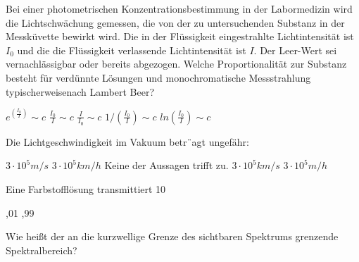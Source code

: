 \documentclass[11pt]{exam}
\begin{document}
\setlength{\voffset}{-0.5in}
\setlength{\headsep}{5pt}

\hspace{2mm}
 \hspace{5mm}
\vspace{4mm}

\begin{questions}

\question Bei einer photometrischen Konzentrationsbestimmung in der Labormedizin wird die Lichtschwächung gemessen, die von der zu untersuchenden Substanz in der Messküvette bewirkt wird. Die in der Flüssigkeit eingestrahlte Lichtintensität ist \( I_0 \) und die die Flüssigkeit verlassende Lichtintensität ist \(I\). Der Leer-Wert sei vernachlässigbar oder bereits abgezogen. Welche Proportionalität zur Substanz besteht für verdünnte Lösungen und monochromatische Messstrahlung typischerweisenach Lambert Beer?

\begin{choices}
	\choice \( e^{( \frac{I_0}{I})} \sim c \)
	\choice \( \frac{I_0}{I} \sim c \)
	\choice \( \frac{I}{I_0} \sim c \)
	\choice \( 1/( \frac{I_0}{I}) \sim c \)
	\choice \( ln ( \frac{I_0}{I}) \sim c \)
\end{choices}

\vspace{3mm}\question Die Lichtgeschwindigkeit im Vakuum betr¨agt ungefähr:

\begin{choices}
	\choice \( 3 \cdot10^5 m/s \)
	\choice \( 3 \cdot10^5 km/h \)
	\choice Keine der Aussagen trifft zu.
	\choice \( 3 \cdot10^5 km/s \)
	\choice \( 3 \cdot10^5 m/h \)
\end{choices}

\vspace{3mm}\question Eine Farbstofflösung transmittiert 10 %

\begin{choices}
	,01
	,99
\end{choices}

\vspace{3mm}\question Wie heißt der an die kurzwellige Grenze des sichtbaren Spektrums grenzende Spektralbereich?


\end{questions}
\end{document}
